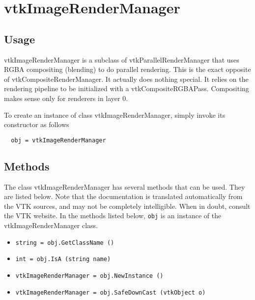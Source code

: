 \section{vtkImageRenderManager}

\subsection{Usage}

 vtkImageRenderManager is a subclass of vtkParallelRenderManager that
 uses RGBA compositing (blending) to do parallel rendering.
 This is the exact opposite of vtkCompositeRenderManager.
 It actually does nothing special. It relies on the rendering pipeline to be
 initialized with a vtkCompositeRGBAPass.
 Compositing makes sense only for renderers in layer 0.

To create an instance of class vtkImageRenderManager, simply
invoke its constructor as follows
\begin{verbatim}
  obj = vtkImageRenderManager
\end{verbatim}
\subsection{Methods}

The class vtkImageRenderManager has several methods that can be used.
  They are listed below.
Note that the documentation is translated automatically from the VTK sources,
and may not be completely intelligible.  When in doubt, consult the VTK website.
In the methods listed below, \verb|obj| is an instance of the vtkImageRenderManager class.
\begin{itemize}
\item  \verb|string = obj.GetClassName ()|

\item  \verb|int = obj.IsA (string name)|

\item  \verb|vtkImageRenderManager = obj.NewInstance ()|

\item  \verb|vtkImageRenderManager = obj.SafeDownCast (vtkObject o)|

\end{itemize}
